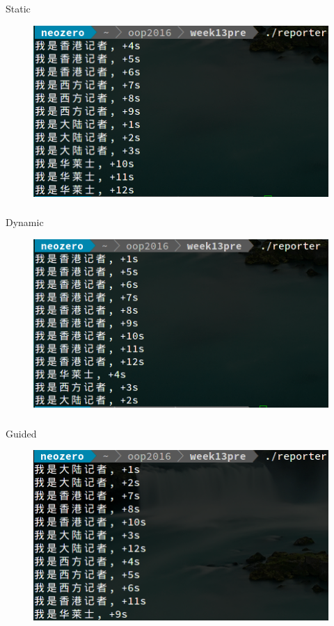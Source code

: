 \documentclass{beamer}
\begin{document}
	\begin{frame}
		\frametitle{\insertsubsection}
		\begin{block}{Static}
			\begin{figure}[H]
				\centering
				\includegraphics[width=0.8\linewidth]{sche_static.png}
			\end{figure}
		\end{block}
	\end{frame}
	\begin{frame}
		\frametitle{\insertsubsection}
		\begin{block}{Dynamic}
			\begin{figure}[H]
				\centering
				\includegraphics[width=0.8\linewidth]{sche_dynamic.png}
			\end{figure}
		\end{block}
	\end{frame}
	\begin{frame}
		\frametitle{\insertsubsection}
		\begin{block}{Guided}
			\begin{figure}[H]
				\centering
				\includegraphics[width=0.8\linewidth]{sche_guided.png}
			\end{figure}
		\end{block}
	\end{frame}
	
\end{document}
